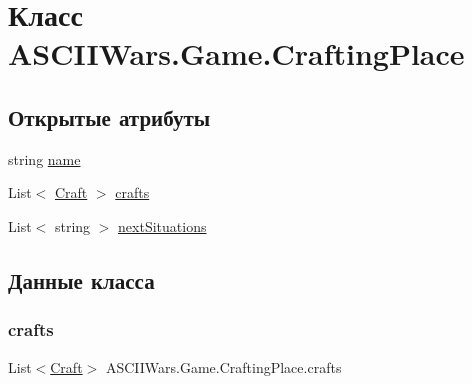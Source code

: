 \hypertarget{class_a_s_c_i_i_wars_1_1_game_1_1_crafting_place}{}\section{Класс A\+S\+C\+I\+I\+Wars.\+Game.\+Crafting\+Place}
\label{class_a_s_c_i_i_wars_1_1_game_1_1_crafting_place}
\subsection*{Открытые атрибуты}
\begin{DoxyCompactItemize}
\item 
string \hyperlink{class_a_s_c_i_i_wars_1_1_game_1_1_crafting_place_a654552576280ed86d81e1c90fadb6ae6}{name}
\item 
List$<$ \hyperlink{class_a_s_c_i_i_wars_1_1_game_1_1_craft}{Craft} $>$ \hyperlink{class_a_s_c_i_i_wars_1_1_game_1_1_crafting_place_a0eaea08a4003a6fcc22898b3245c92d4}{crafts}
\item 
List$<$ string $>$ \hyperlink{class_a_s_c_i_i_wars_1_1_game_1_1_crafting_place_a29294bd0619212b716e258dce38c89dc}{next\+Situations}
\end{DoxyCompactItemize}


\subsection{Данные класса}
\hypertarget{class_a_s_c_i_i_wars_1_1_game_1_1_crafting_place_a0eaea08a4003a6fcc22898b3245c92d4}{}\label{class_a_s_c_i_i_wars_1_1_game_1_1_crafting_place_a0eaea08a4003a6fcc22898b3245c92d4} 
\subsubsection{\texorpdfstring{crafts}{crafts}}
{\footnotesize\ttfamily List$<$\hyperlink{class_a_s_c_i_i_wars_1_1_game_1_1_craft}{Craft}$>$ A\+S\+C\+I\+I\+Wars.\+Game.\+Crafting\+Place.\+crafts}

\hypertarget{class_a_s_c_i_i_wars_1_1_game_1_1_crafting_place_a654552576280ed86d81e1c90fadb6ae6}{}\label{class_a_s_c_i_i_wars_1_1_game_1_1_crafting_place_a654552576280ed86d81e1c90fadb6ae6} 

